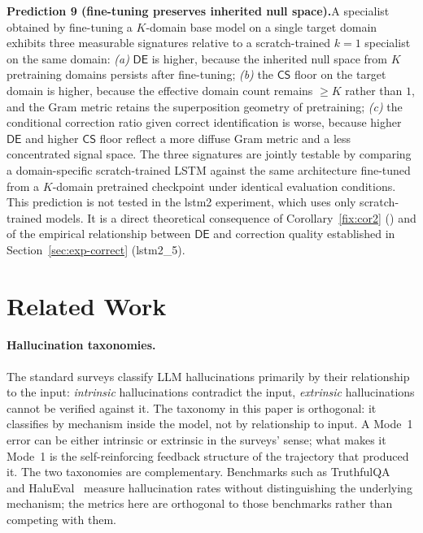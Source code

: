 \documentclass[11pt,a4paper]{article}
\newcommand{\CS}{\mathsf{CS}}
\newcommand{\DE}{\mathsf{DE}}
\begin{document}
\begin{mdframed}[backgroundcolor=insightbg, linecolor=insightcol, linewidth=1pt]
\textbf{Prediction 9 (fine-tuning preserves inherited null space).}\quad A specialist obtained by fine-tuning a $K$-domain base model on a single target domain exhibits three measurable signatures relative to a scratch-trained $k = 1$ specialist on the same domain: \emph{(a)} $\DE$ is higher, because the inherited null space from $K$ pretraining domains persists after fine-tuning; \emph{(b)} the $\CS$ floor on the target domain is higher, because the effective domain count remains $\geq K$ rather than $1$, and the Gram metric retains the superposition geometry of pretraining; \emph{(c)} the conditional correction ratio given correct identification is worse, because higher $\DE$ and higher $\CS$ floor reflect a more diffuse Gram metric and a less concentrated signal space. The three signatures are jointly testable by comparing a domain-specific scratch-trained LSTM against the same architecture fine-tuned from a $K$-domain pretrained checkpoint under identical evaluation conditions. This prediction is not tested in the lstm2 experiment, which uses only scratch-trained models. It is a direct theoretical consequence of Corollary~\ref{fix:cor2} (\cite{SyndromeAlgebra}) and of the empirical relationship between $\DE$ and correction quality established in Section~\ref{sec:exp-correct} (lstm2\_5).
\end{mdframed}

\section{Related Work}
\label{sec:related}

\paragraph{Hallucination taxonomies.} The standard surveys
\cite{Ji2023, Zhang2023, Huang2023} classify LLM hallucinations primarily by their relationship to the input: \emph{intrinsic} hallucinations contradict the input, \emph{extrinsic} hallucinations cannot be verified against it. The taxonomy in this paper is orthogonal: it classifies by mechanism inside the model, not by relationship to input. A Mode~1 error can be either intrinsic or extrinsic in the surveys' sense; what makes it Mode~1 is the self-reinforcing feedback structure of the trajectory that produced it. The two taxonomies are complementary. Benchmarks such as TruthfulQA~\cite{Lin2022} and HaluEval~\cite{Li2023} measure hallucination rates without distinguishing the underlying mechanism; the metrics here are orthogonal to those benchmarks rather than competing with them.
\end{document}
